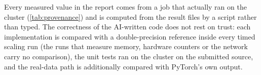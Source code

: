 \noindent Every measured value in the report comes from a job that actually ran on
the cluster (\cref{tab:provenance}) and is computed from the result files by a
script rather than typed. The correctness of the AI-written code does not rest on
trust: each implementation is compared with a double-precision reference inside
every timed scaling run (the runs that measure memory, hardware counters or the
network carry no comparison), the unit tests ran on the cluster on the submitted
source, and the real-data path is additionally compared with PyTorch's own
output.
